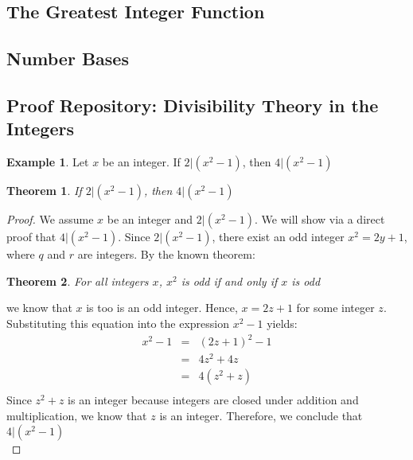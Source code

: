 \documentclass{book}
\newtheorem{theorem}{Theorem}[section]
\theoremstyle{definition}
\newtheorem{example}{Example}[definition]
\theoremstyle{remark}
\begin{document}
\subsection{The Greatest Integer Function}
\subsection{Number Bases}


\newpage
\subsection*{Proof Repository: Divisibility Theory in the Integers}

\begin{example}
Let $x$ be an integer. If $2 | (x^2 - 1)$, then $4 | (x^2 - 1)$ \\

\begin{tcolorbox}
	\begin{theorem}
		If $2 | (x^2 - 1)$, then $4 | (x^2 - 1)$
	\end{theorem}
\end{tcolorbox}

\begin{proof}
We assume $x$ be an integer and $2 | (x^2 - 1)$. We will show via a direct proof that $4 | (x^2 - 1)$. Since $2 | (x^2 - 1)$, there exist an odd integer $x^2 = 2y + 1$, where $q$ and $r$ are integers. By the known theorem: 
	\begin{theorem}
	\label{oddsquaretheory}		
		For all integers $x$, $x^2$ is odd if and only if $x$ is odd
	\end{theorem}
we know that $x$ is too is an odd integer. Hence, $x = 2z + 1$ for some integer $z$. Substituting this equation into the expression $x^2 - 1$ yields:
\begin{eqnarray*}
	x^2 - 1 & = & (2z + 1)^2 - 1 \nonumber \\	
	& = & 4z^2 + 4z \nonumber \\	
	& = & 4(z^2 + z) \nonumber \\	
\end{eqnarray*}
Since $z^2 + z$ is an integer because integers are closed under addition  and multiplication, we know that $z$ is an integer. Therefore, we conclude that $4 | (x^2 - 1)$ \\
\end{proof}
\end{example}



\newpage
\end{document}
